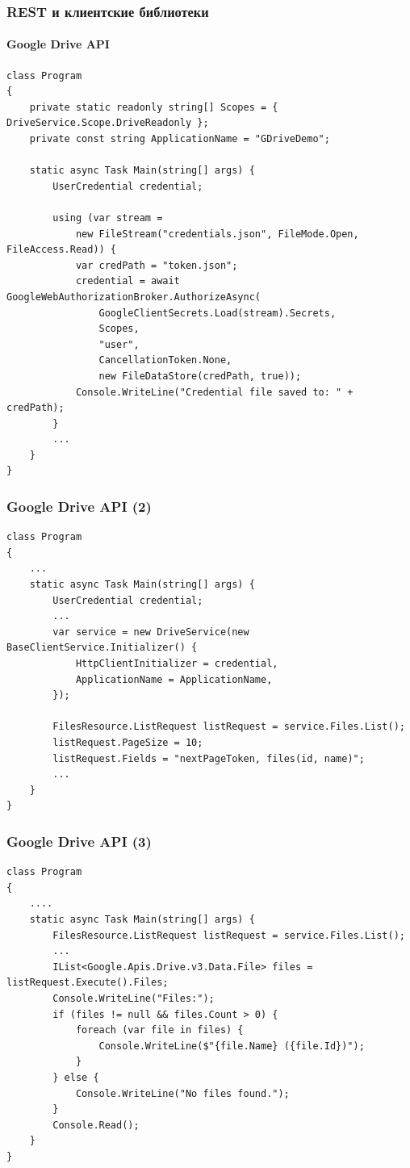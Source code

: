 \documentclass[xetex,mathserif,serif]{beamer}
\begin{document}
	\begin{frame}[fragile]
		\frametitle{REST и клиентские библиотеки}
		\framesubtitle{Google Drive API}
		\begin{scriptsize}
			\begin{verbatim}
class Program
{
    private static readonly string[] Scopes = { DriveService.Scope.DriveReadonly };
    private const string ApplicationName = "GDriveDemo";

    static async Task Main(string[] args) {
        UserCredential credential;

        using (var stream =
            new FileStream("credentials.json", FileMode.Open, FileAccess.Read)) {
            var credPath = "token.json";
            credential = await GoogleWebAuthorizationBroker.AuthorizeAsync(
                GoogleClientSecrets.Load(stream).Secrets,
                Scopes,
                "user",
                CancellationToken.None,
                new FileDataStore(credPath, true));
            Console.WriteLine("Credential file saved to: " + credPath);
        }
        ...
    }
}
			\end{verbatim}
		\end{scriptsize}
	\end{frame}

	\begin{frame}[fragile]
		\frametitle{Google Drive API (2)}
		\begin{scriptsize}
			\begin{verbatim}
class Program
{
    ...
    static async Task Main(string[] args) {
        UserCredential credential;
        ...
        var service = new DriveService(new BaseClientService.Initializer() {
            HttpClientInitializer = credential,
            ApplicationName = ApplicationName,
        });

        FilesResource.ListRequest listRequest = service.Files.List();
        listRequest.PageSize = 10;
        listRequest.Fields = "nextPageToken, files(id, name)";
        ...
    }
}
			\end{verbatim}
		\end{scriptsize}
	\end{frame}

	\begin{frame}[fragile]
		\frametitle{Google Drive API (3)}
		\begin{scriptsize}
			\begin{verbatim}
class Program
{
    ....
    static async Task Main(string[] args) {
        FilesResource.ListRequest listRequest = service.Files.List();
        ...
        IList<Google.Apis.Drive.v3.Data.File> files = listRequest.Execute().Files;
        Console.WriteLine("Files:");
        if (files != null && files.Count > 0) {
            foreach (var file in files) {
                Console.WriteLine($"{file.Name} ({file.Id})");
            }
        } else {
            Console.WriteLine("No files found.");
        }
        Console.Read();
    }
}
			\end{verbatim}
		\end{scriptsize}
	\end{frame}
\end{document}
